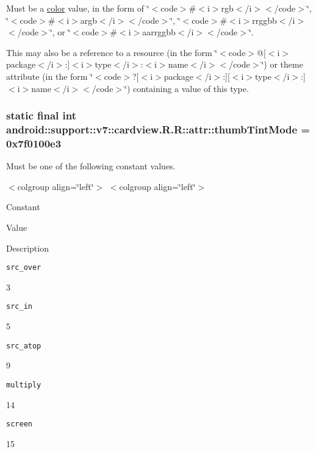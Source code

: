 Must be a \hyperlink{classandroid_1_1support_1_1v7_1_1cardview_1_1_r_1_1color}{color} value, in the form of \char`\"{}$<$code$>$\#$<$i$>$rgb$<$/i$>$$<$/code$>$\char`\"{}, \char`\"{}$<$code$>$\#$<$i$>$argb$<$/i$>$$<$/code$>$\char`\"{}, \char`\"{}$<$code$>$\#$<$i$>$rrggbb$<$/i$>$$<$/code$>$\char`\"{}, or \char`\"{}$<$code$>$\#$<$i$>$aarrggbb$<$/i$>$$<$/code$>$\char`\"{}. 

This may also be a reference to a resource (in the form \char`\"{}$<$code$>$@\mbox{[}$<$i$>$package$<$/i$>$:\mbox{]}$<$i$>$type$<$/i$>$:$<$i$>$name$<$/i$>$$<$/code$>$\char`\"{}) or theme attribute (in the form \char`\"{}$<$code$>$?\mbox{[}$<$i$>$package$<$/i$>$:\mbox{]}\mbox{[}$<$i$>$type$<$/i$>$:\mbox{]}$<$i$>$name$<$/i$>$$<$/code$>$\char`\"{}) containing a value of this type. \hypertarget{classandroid_1_1support_1_1v7_1_1cardview_1_1_r_1_1attr_c96671e40775a04f6d1c9a2c8e71a368}{
\subsubsection[{thumbTintMode}]{\setlength{\rightskip}{0pt plus 5cm}static final int android::support::v7::cardview.R.R::attr::thumbTintMode = 0x7f0100e3}}
\label{classandroid_1_1support_1_1v7_1_1cardview_1_1_r_1_1attr_c96671e40775a04f6d1c9a2c8e71a368}


Must be one of the following constant values. \begin{TabularC}{0}
\hline
\end{TabularC}
$<$colgroup align=\char`\"{}left\char`\"{}$>$ $<$colgroup align=\char`\"{}left\char`\"{}$>$ 

Constant

Value

Description 

{\tt src\_\-over}

3

{\tt src\_\-in}

5

{\tt src\_\-atop}

9

{\tt multiply}

14

{\tt screen}

15

